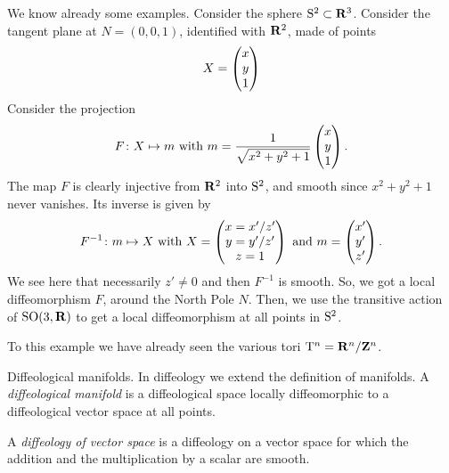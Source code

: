 \begin{Article}{We know already some examples.}{}
  Consider the sphere $\mathrm{S}^2 \subset \mathbf{R}^3$.
  Consider the tangent plane at $N = (0,0,1)$,
  identified with $\mathbf{R}^2$,
  made of points
  $$%
    X = \Vector{x \\ y \\ 1}
  $$%
  Consider the projection
  $$%
    F \colon X \mapsto m
    \SpacedText{with}
    m = {1 \over \sqrt{x^2 + y^2 +1}} \Vector{x \\ y \\ 1}.
  $$%
  The map $F$ is clearly injective from $\mathbf{R}^2$ into $\mathrm{S}^2$,
  and smooth since $x^2 + y^2 +1$ never vanishes.
  Its inverse is given by
  $$%
    F^{-1} \colon m \mapsto X
    \SpacedText{with}
    X  = \Vector{ x = x'/z'  \\ y = y'/z' \\ z = 1}
    \SpacedText{and}
    m = \Vector{x' \\ y' \\ z'}.
  $$%
  We see here that necessarily $z' \neq 0$ and then $F^{-1}$ is smooth.
  So,
  we got a local diffeomorphism $F$,
  around the North Pole $N$.
  Then,
  we use the transitive action of $\mathrm{SO}(3,\mathbf{R})$ to get a local diffeomorphism at all points in $\mathrm{S}^2$.

  To this example we have already seen the various tori $\mathrm{T}^n = \mathbf{R}^n/\mathbf{Z}^n$.
\end{Article}

\begin{Article}{Diffeological manifolds.}{}
  In diffeology we extend the definition of manifolds.
  A \emph{diffeological manifold} is a diffeological space locally diffeomorphic to a diffeological vector space at all points.

  A \emph{diffeology of vector space} is a diffeology on a vector space for which the addition and the multiplication by a scalar are smooth.
\end{Article}

